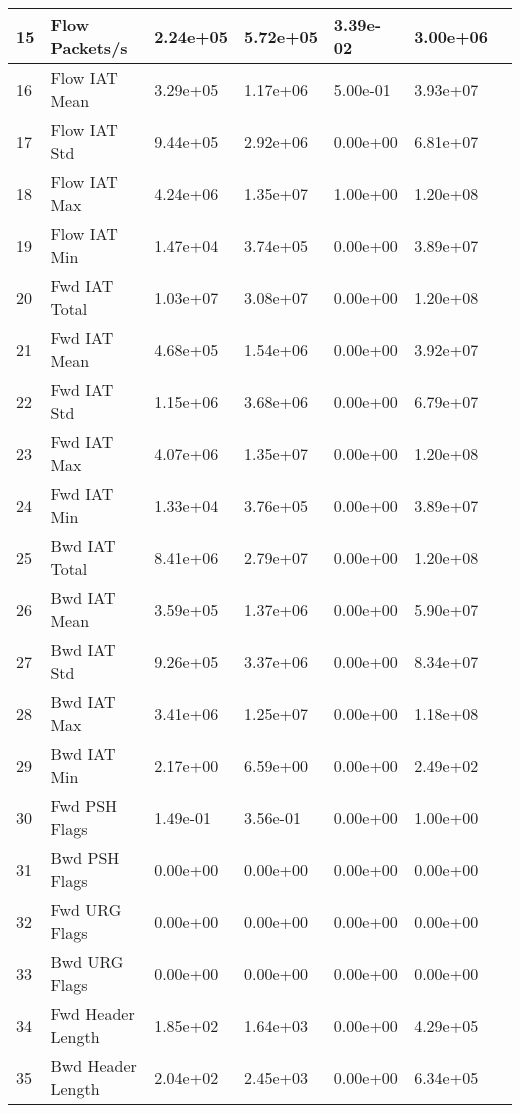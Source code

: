 \begin{center}
\begin{longtable}{|l|l|l|l|l|l|l|}
        15 & Flow Packets/s & 2.24e+05 & 5.72e+05 & 3.39e-02 & 3.00e+06 \\
        \hline
        16 & Flow IAT Mean & 3.29e+05 & 1.17e+06 & 5.00e-01 & 3.93e+07 \\
        \hline
        17 & Flow IAT Std & 9.44e+05 & 2.92e+06 & 0.00e+00 & 6.81e+07 \\
        \hline
        18 & Flow IAT Max & 4.24e+06 & 1.35e+07 & 1.00e+00 & 1.20e+08 \\
        \hline
        19 & Flow IAT Min & 1.47e+04 & 3.74e+05 & 0.00e+00 & 3.89e+07 \\
        \hline
        20 & Fwd IAT Total & 1.03e+07 & 3.08e+07 & 0.00e+00 & 1.20e+08 \\
        \hline
        21 & Fwd IAT Mean & 4.68e+05 & 1.54e+06 & 0.00e+00 & 3.92e+07 \\
        \hline
        22 & Fwd IAT Std & 1.15e+06 & 3.68e+06 & 0.00e+00 & 6.79e+07 \\
        \hline
        23 & Fwd IAT Max & 4.07e+06 & 1.35e+07 & 0.00e+00 & 1.20e+08 \\
        \hline
        24 & Fwd IAT Min & 1.33e+04 & 3.76e+05 & 0.00e+00 & 3.89e+07 \\
        \hline
        25 & Bwd IAT Total & 8.41e+06 & 2.79e+07 & 0.00e+00 & 1.20e+08 \\
        \hline
        26 & Bwd IAT Mean & 3.59e+05 & 1.37e+06 & 0.00e+00 & 5.90e+07 \\
        \hline
        27 & Bwd IAT Std & 9.26e+05 & 3.37e+06 & 0.00e+00 & 8.34e+07 \\
        \hline
        28 & Bwd IAT Max & 3.41e+06 & 1.25e+07 & 0.00e+00 & 1.18e+08 \\
        \hline
        29 & Bwd IAT Min & 2.17e+00 & 6.59e+00 & 0.00e+00 & 2.49e+02 \\
        \hline
        30 & Fwd PSH Flags & 1.49e-01 & 3.56e-01 & 0.00e+00 & 1.00e+00 \\
        \hline
        31 & Bwd PSH Flags & 0.00e+00 & 0.00e+00 & 0.00e+00 & 0.00e+00 \\
        \hline
        32 & Fwd URG Flags & 0.00e+00 & 0.00e+00 & 0.00e+00 & 0.00e+00 \\
        \hline
        33 & Bwd URG Flags & 0.00e+00 & 0.00e+00 & 0.00e+00 & 0.00e+00 \\
        \hline
        34 & Fwd Header Length & 1.85e+02 & 1.64e+03 & 0.00e+00 & 4.29e+05 \\
        \hline
        35 & Bwd Header Length & 2.04e+02 & 2.45e+03 & 0.00e+00 & 6.34e+05 \\

\end{longtable}
\end{center}
